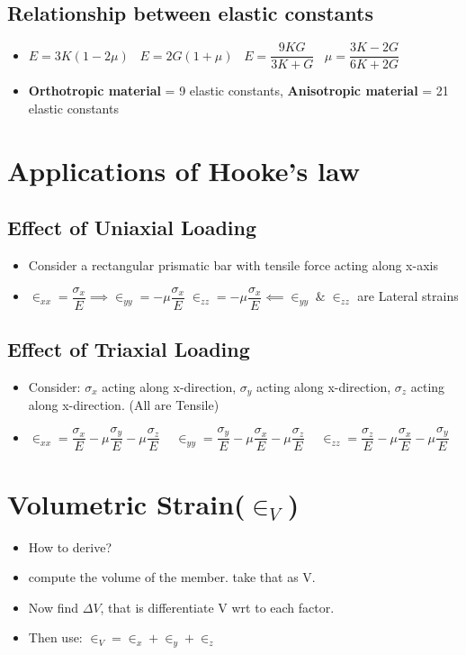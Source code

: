 \documentclass[8pt]{report}
\begin{document}
		\subsection{Relationship between elastic constants}
			\begin{itemize}
				\item $\boxed{E = 3K(1-2\mu)}\;\;\;\boxed{E=2G(1+\mu)}\;\;\;\boxed{E = \dfrac{9KG}{3K+G}}\;\;\;\boxed{\mu = \dfrac{3K-2G}{6K+2G}}$
				\item \textbf{Orthotropic material} = 9 elastic constants, \textbf{Anisotropic material} = 21 elastic constants
			\end{itemize}\hrulefill
	\section{Applications of Hooke's law}
		\subsection{Effect of Uniaxial Loading}
			\begin{itemize}
				\item Consider a rectangular prismatic bar with tensile force acting along x-axis
				\item[] $\boxed{\in_{xx} = \dfrac{\sigma_x}{E}} \implies \boxed{\in_{yy} = -\mu\dfrac{\sigma_x}{E}}\;\boxed{\in_{zz}=-\mu\dfrac{\sigma_x}{E}} \impliedby \in_{yy}\;\&\;\in_{zz}$ are Lateral strains
			\end{itemize}
		\subsection{Effect of Triaxial Loading}
			\begin{itemize}
				\item Consider: $\sigma_x$ acting along x-direction, $\sigma_y$ acting along x-direction, $\sigma_z$ acting along x-direction. (All are Tensile)
				\item $\boxed{\in_{xx} = \dfrac{\sigma_x}{E} -\mu\dfrac{\sigma_y}{E} -\mu\dfrac{\sigma_z}{E}}\;\;\;$ $\boxed{\in_{yy} = \dfrac{\sigma_y}{E} -\mu\dfrac{\sigma_x}{E} -\mu\dfrac{\sigma_z}{E}}\;\;\;$ $\boxed{\in_{zz} = \dfrac{\sigma_z}{E} -\mu\dfrac{\sigma_x}{E} -\mu\dfrac{\sigma_y}{E}}$
			\end{itemize}\hrulefill	%
	\section{Volumetric Strain($\in_V$)}
		\begin{itemize}
			\item How to derive?
			\item compute the volume of the member. take that as V.
			\item Now find $\Delta V$, that is differentiate V wrt to each factor.
			\item Then use: $\boxed{\in_V = \in_x+\in_y+\in_z}$
		\end{itemize}
\end{document}
